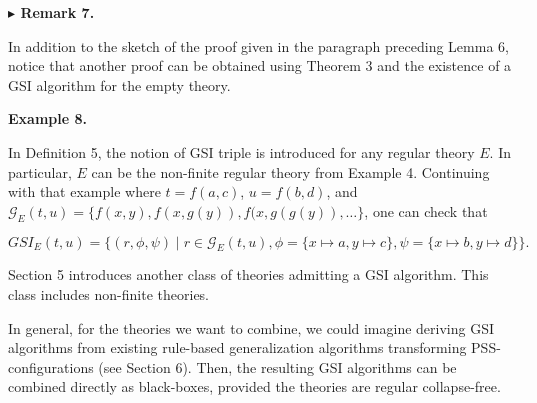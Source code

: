 \documentclass[10pt,a4paper]{amsart}
\begin{document}
 
 
 
\par\medskip\noindent\textbf{$\blacktriangleright$ Remark 7.}\par
 
 
In addition to the sketch of the proof given in the paragraph preceding Lemma 6, notice that another proof can be obtained using Theorem 3 and the existence of a GSI algorithm for the empty theory.\par
 
 
 
 
\par\medskip\noindent\textbf{Example 8.}\par
 
 
In Definition 5, the notion of GSI triple is introduced for any regular theory $E$. In particular, $E$ can be the non-finite regular theory from Example 4. Continuing with that example where $t=f(a,c)$, $u=f(b,d)$, and $\mathcal{G}_{E}(t,u)=\{f(x,y),f(x,g(y)),f(x,g(g(y)),\ldots\}$, one can check that\par
  
\par  \quad  \[GSI_{E}(t,u)=\{(r,\phi,\psi)\mid r\in\mathcal{G}_{E}(t,u),\phi=\{x\mapsto a,y\mapsto c\},\psi=\{x\mapsto b,y\mapsto d\}\}.\]\quad  \quad  
  
 
 
 
Section 5 introduces another class of theories admitting a GSI algorithm. This class includes non-finite theories.\par
 
 
 
In general, for the theories we want to combine, we could imagine deriving GSI algorithms from existing rule-based generalization algorithms transforming PSS-configurations (see Section 6). Then, the resulting GSI algorithms can be combined directly as black-boxes, provided the theories are regular collapse-free.\par
 
\end{document}
